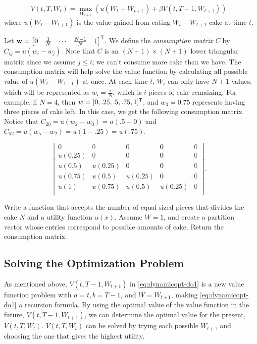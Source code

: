 \begin{equation}\label{eq:dynamicopt-do1}
V(t, T, W_{t}) = \max_{W_{t+1}} \left(u(W_{t} - W_{t+1}) + \beta V(t, T-1, W_{t+1})\right)
\end{equation}
where $u(W_t - W_{t+1})$ is the value gained from eating $W_t - W_{t+1}$ cake at time $t$.

Let $\mathbf{w} = \begin{bmatrix}0 & \frac{1}{N} & \cdots & \frac{N-1}{N} & 1\end{bmatrix}^{\mathsf T}$.
We define the \emph{consumption matrix} $C$ by $C_{ij} = u(w_i - w_j)$.
Note that $C$ is an $(N+1) \times (N+1)$ lower triangular matrix since we assume $j\leq i$; we can't consume more cake than we have.
The consumption matrix will help solve the value function by calculating all possible value of $u(W_{t} - W_{t+1})$ at once.
At each time $t$, $W_t$ can only have $N+1$ values, which will be represented as $w_i = \frac{i}{N}$, which is $i$ pieces of cake remaining.
For example, if $N=4$, then $w=[0, .25, .5, .75, 1]^{\mathsf T}$, and $w_3 = 0.75$ represents having three pieces of cake left.
In this case, we get the following consumption matrix.
Notice that $C_{20} = u(w_2-w_0) = u(.5-0)$ and $C_{52} = u(w_5-w_2) = u(1-.25) = u(.75)$.

\[
\begin{bmatrix}
0 & 0 & 0 & 0 & 0 \\
u(0.25) & 0 & 0 & 0 & 0 \\
u(0.5) & u(0.25) & 0 & 0 & 0 \\
u(0.75) & u(0.5) & u(0.25) & 0 & 0 \\
u(1) & u(0.75) & u(0.5) & u(0.25) & 0 \\
\end{bmatrix}.
\]

\begin{problem}

Write a function that accepts the number of equal sized pieces that divides the cake $N$ and a utility function $u(x)$.
Assume $W=1$, and create a partition vector whose entries correspond to possible amounts of cake.
Return the consumption matrix.

\end{problem}


\subsection*{Solving the Optimization Problem}

As mentioned above, $V(t, T-1, W_{t+1})$ in \ref{eq:dynamicopt-do1} is a new value function problem with $a = t, b = T-1$, and $W = W_{t+1}$, making \ref{eq:dynamicopt-do1} a recursion formula.
By using the optimal value of the value function in the future, $V(t, T-1, W_{t+1})$, we can determine the optimal value for the present, $V(t, T, W_{t})$.
$V(t, T, W_{t})$ can be solved by trying each possible $W_{t+1}$ and choosing the one that gives the highest utility.


